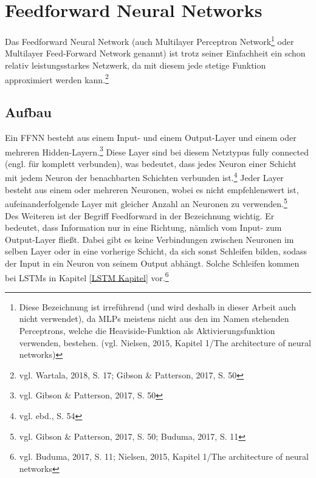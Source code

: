 \documentclass[a4paper,12pt,ngerman,oneside]{scrreprt}	%
\newcommand{\practitioner}[1]{vgl. Gibson \& Patterson, 2017, S. {#1}}
\newcommand{\fundamentals}[1]{vgl. Buduma, 2017, S. {#1}}
\newcommand{\ebd}[1]{vgl. ebd., S. {#1}}
\begin{document}
	\chapter{Feedforward Neural Networks}\label{FFNN Kapitel}
	Das Feedforward Neural Network (auch Multilayer Perceptron Network\footnote{Diese Bezeichnung ist irreführend (und wird deshalb in dieser Arbeit auch nicht verwendet), da MLPs meistens nicht aus den im Namen stehenden Perceptrons, welche die Heaviside-Funktion als Aktivierungsfunktion verwenden, bestehen. (vgl. Nielsen, 2015, Kapitel 1/The architecture of neural networks)} oder Multilayer Feed-Forward Network genannt) ist trotz seiner Einfachheit ein schon relativ leistungsstarkes Netzwerk, da mit diesem jede stetige Funktion approximiert werden kann.\footnote{vgl. Wartala, 2018, S. 17; Gibson \& Patterson, 2017, S. 50}
		\section{Aufbau}
		Ein FFNN besteht aus einem Input- und einem Output-Layer und einem oder mehreren Hidden-Layern.\footnote{\practitioner{50}} Diese Layer sind bei diesem Netztypus fully connected (engl. für komplett verbunden), was bedeutet, dass jedes Neuron einer Schicht mit jedem Neuron der benachbarten Schichten verbunden ist.\footnote{\ebd{54}} Jeder Layer besteht aus einem oder mehreren Neuronen, wobei es nicht empfehlenswert ist, aufeinanderfolgende Layer mit gleicher Anzahl an Neuronen zu verwenden.\footnote{vgl. Gibson \& Patterson, 2017, S. 50; Buduma, 2017, S. 11} \\
		
		Des Weiteren ist der Begriff Feedforward in der Bezeichnung wichtig. Er bedeutet, dass Information nur in eine Richtung, nämlich vom Input- zum Output-Layer fließt. Dabei gibt es keine Verbindungen zwischen Neuronen im selben Layer oder in eine vorherige Schicht, da sich sonst Schleifen bilden, sodass der Input in ein Neuron von seinem Output abhängt. Solche Schleifen kommen bei LSTMs in Kapitel \ref{LSTM Kapitel} vor.\footnote{vgl. Buduma, 2017, S. 11; Nielsen, 2015, Kapitel 1/The architecture of neural networks}
		
\end{document}

